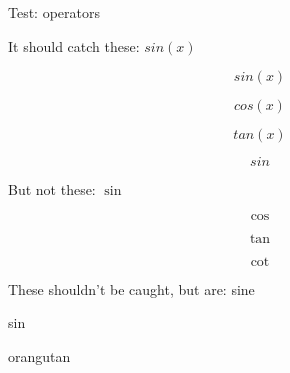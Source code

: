 \documentclass{article}
\begin{document}
Test: operators

It should catch these: $sin(x)$

\[
    sin(x)
\]

\[
cos(x)
\]

\[tan(x)\]

\[
    sin
\]

But not these: $\sin$

\[
    \cos
\]

\[
\tan    
\]

\[\cot\]

These shouldn't be caught, but are: sine

sin

orangutan
\end{document}
